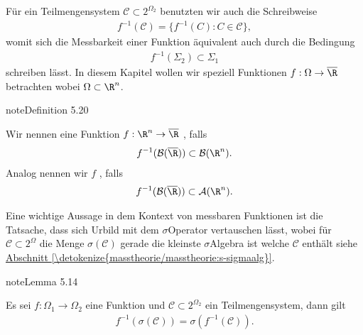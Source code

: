 \documentclass[letterpaper,10pt,german]{jupyterBook}
\begin{document}
\sphinxAtStartPar
Für ein Teilmengensystem \(\mathcal{C}\subset 2^{\Omega_2}\) benutzten wir auch die Schreibweise
\begin{equation*}
\begin{split}f^{-1}(\mathcal{C}) = \{ f^{-1}(C): C\in\mathcal{C}\},\end{split}
\end{equation*}
\sphinxAtStartPar
womit sich die Messbarkeit einer Funktion äquivalent auch durch die Bedingung
\begin{equation*}
\begin{split}f^{-1}(\Sigma_2)\subset\Sigma_1\end{split}
\end{equation*}
\sphinxAtStartPar
schreiben lässt. In diesem Kapitel wollen wir speziell Funktionen \(f:\Omega\to\overline{\R}\) betrachten wobei \(\Omega\subset\R^n\).
\label{masstheorie/lebesgue_integral:definition-1}
\begin{sphinxadmonition}{note}{Definition 5.20}



\sphinxAtStartPar
Wir nennen eine Funktion \(f:\R^n\to\overline{\R}\) , falls
\begin{equation*}
\begin{split}f^{-1}(\mathcal{B}(\overline{\R}))\subset \mathcal{B}(\R^n).\end{split}
\end{equation*}
\sphinxAtStartPar
Analog nennen wir \(f\) , falls
\begin{equation*}
\begin{split}f^{-1}(\mathcal{B}(\overline{\R}))\subset \mathcal{A}(\R^n).\end{split}
\end{equation*}\end{sphinxadmonition}

\sphinxAtStartPar
Eine wichtige Aussage in dem Kontext von messbaren Funktionen ist die Tatsache, dass sich Urbild mit dem \(\sigma\)\sphinxhyphen{}Operator vertauschen lässt, wobei für \(\mathcal{C}\subset 2^\Omega\) die Menge \(\sigma(\mathcal{C})\) gerade die kleinste \(\sigma\)\sphinxhyphen{}Algebra ist welche \(\mathcal{C}\) enthält siehe \hyperref[\detokenize{masstheorie/masstheorie:s-sigmaalg}]{Abschnitt \ref{\detokenize{masstheorie/masstheorie:s-sigmaalg}}}.
\label{masstheorie/lebesgue_integral:lem:changesigma}
\begin{sphinxadmonition}{note}{Lemma 5.14}



\sphinxAtStartPar
Es sei \(f:\Omega_1\to\Omega_2\) eine Funktion und \(\mathcal{C}\subset 2^{\Omega_2}\) ein Teilmengensystem, dann gilt
\begin{equation*}
\begin{split}f^{-1}(\sigma(\mathcal{C})) = \sigma(f^{-1}(\mathcal{C})).\end{split}
\end{equation*}\end{sphinxadmonition}
\end{document}
